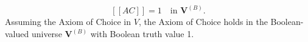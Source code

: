 $$[[AC]] = 1 \quad \text{in } \mathbf{V}^{(B)}.$$
Assuming the Axiom of Choice in $V$, the Axiom of Choice holds in the Boolean-valued universe $\mathbf{V}^{(B)}$ with Boolean truth value 1.
